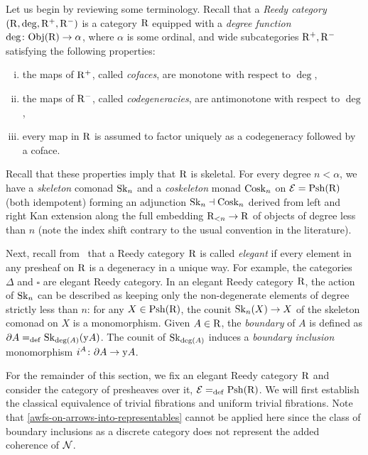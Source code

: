 \documentclass[reqno,10pt,a4paper,oneside]{amsart}
\begin{document}
\medskip

Let us begin by reviewing some terminology.
Recall that a \emph{Reedy category} $(\R, \deg, \Rp, \Rm)$ is a category $\R$ equipped with a \emph{degree function} $\deg \co \obj(\R) \to \alpha$, where $\alpha$ is some ordinal, and wide subcategories $\Rp, \Rm$ satisfying the following properties:
\begin{enumerate}[(i)]
\item the maps of $\Rp$, called \emph{cofaces}, are monotone with respect to $\deg$,
\item the maps of $\Rm$, called \emph{codegeneracies}, are antimonotone with respect to $\deg$,
\item every map in $\R$ is assumed to factor uniquely as a codegeneracy followed by a coface.
\end{enumerate}
Recall that these properties imply that $\R$ is skeletal.
For every degree $n < \alpha$, we have a \emph{skeleton} comonad $\Sk_n$ and a \emph{coskeleton} monad $\Cosk_n$ on $\catE = \Psh(\R)$ (both idempotent) forming an adjunction $\Sk_n \dashv \Cosk_n$ derived from left and right Kan extension along the full embedding $\R_{<n} \to \R$ of objects of degree less than $n$ (note the index shift contrary to the usual convention in the literature).

\medskip

Next, recall from~\cite{bergner-rezk-elegant} that a Reedy category $\R$ is called \emph{elegant} if every element in any presheaf on $\R$ is a degeneracy in a unique way.
For example, the categories $\Delta$ and $\square$ are elegant Reedy category.
In an elegant Reedy category $\R$, the action of $\Sk_n$ can be described as keeping only the non-degenerate elements of degree strictly less than $n$: for any $X \in \Psh(\R)$, the counit $\Sk_n(X) \to X$ of the skeleton comonad on $X$ is a monomorphism.
Given $A \in \R$, the \emph{boundary} of $A$ is defined as $\partial A \defeq \Sk_{\deg(A)}(\yon A)$.
The counit of $\Sk_{\deg(A)}$ induces a \emph{boundary inclusion} monomorphism $i^A \co \partial A \to \yon A$.

\medskip

For the remainder of this section, we fix an elegant Reedy category $\R$ and consider the category of presheaves over it, $\calE \defeq \Rhat$.
We will first establish the classical equivalence of trivial fibrations and uniform trivial fibrations.
Note that \cref{awfs-on-arrows-into-representables} cannot be applied here since the class of boundary inclusions as a discrete category does not represent the added coherence of $\cal{N}$.
\end{document}
